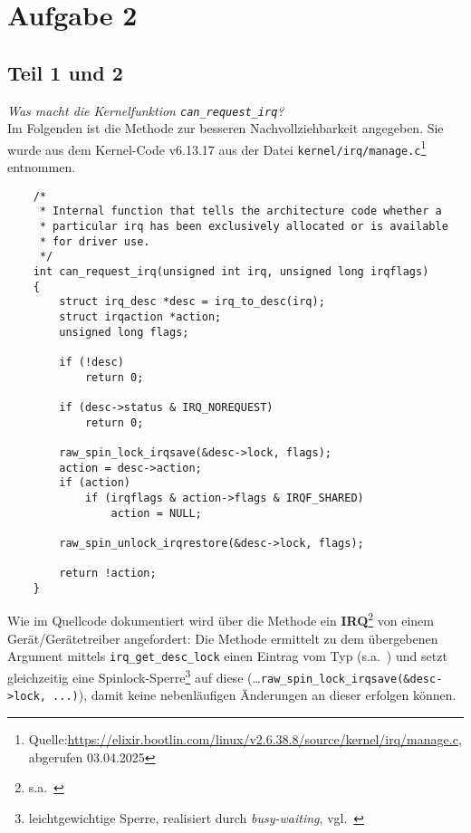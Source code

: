 \chapter{Aufgabe 2}

\section{Teil 1 und 2}

\textit{Was macht die Kernelfunktion \texttt{can\_request\_irq}?}\\

\noindent
Im Folgenden ist die Methode zur besseren Nachvollziehbarkeit angegeben.
Sie wurde aus dem Kernel-Code v6.13.17 aus der Datei \texttt{kernel/irq/manage.c}\footnote{
Quelle:\url{https://elixir.bootlin.com/linux/v2.6.38.8/source/kernel/irq/manage.c}, abgerufen 03.04.2025
} entnommen.\\

\begin{verbatim}
    /*
     * Internal function that tells the architecture code whether a
     * particular irq has been exclusively allocated or is available
     * for driver use.
     */
    int can_request_irq(unsigned int irq, unsigned long irqflags)
    {
        struct irq_desc *desc = irq_to_desc(irq);
        struct irqaction *action;
        unsigned long flags;

        if (!desc)
            return 0;

        if (desc->status & IRQ_NOREQUEST)
            return 0;

        raw_spin_lock_irqsave(&desc->lock, flags);
        action = desc->action;
        if (action)
            if (irqflags & action->flags & IRQF_SHARED)
                action = NULL;

        raw_spin_unlock_irqrestore(&desc->lock, flags);

        return !action;
    }
\end{verbatim}

\noindent
Wie im Quellcode dokumentiert wird über die Methode ein \textbf{IRQ}\footnote{s.a.~\cite[52]{Man20d}} von einem Gerät/Gerätetreiber angefordert: Die Methode ermittelt zu dem übergebenen Argument  mittels \texttt{irq\_get\_desc\_lock} einen Eintrag vom Typ  (s.a.~\cite[64 f.]{Man20d}) und setzt gleichzeitig eine Spinlock-Sperre\footnote{
    leichtgewichtige Sperre, realisiert durch \textit{busy-waiting}, vgl.~\cite[150]{Man20g}
} auf diese  (\ldots \texttt{raw\_spin\_lock\_irqsave(&desc->lock, ...)}), damit keine nebenläufigen Änderungen an dieser erfolgen können.\\

